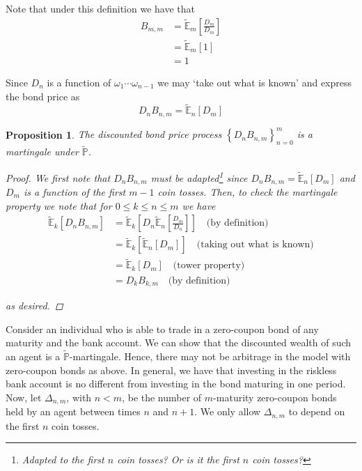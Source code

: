 \documentclass[12pt]{article}
\newtheorem{proposition}{Proposition}
\newlength\tindent
\renewcommand{\indent}{\hspace*{\tindent}}
\renewcommand{\P}{\mathbb P}
\newcommand{\E}{\mathbb E}
\begin{document}
Note that under this definition we have that
\begin{align*}
	B_{m,m} &= \tilde{\E}_m \left[ \frac{D_m}{D_m} \right] \\
	&= \tilde{\E}_m \left[ 1 \right] \\
	&= 1
\end{align*}

\indent Since $D_n$ is a function of $\omega_1\cdots\omega_{n - 1}$ we may `take out what is known' and express the bond price as
\begin{equation*}
	D_nB_{n,m} = \tilde{\E}_n[D_m]
\end{equation*}

\begin{proposition} The discounted bond price process $\left\{ D_nB_{n,m} \right\}^m_{n = 0}$ is a martingale under $\tilde{\P}$. 

\begin{proof} We first note that $D_nB_{n,m}$ must be adapted\footnote{Adapted to the first $n$ coin tosses? Or is it the first $n$ coin tosses?} since $D_nB_{n,m} = \tilde{\E}_n[D_m]$ and $D_m$ is a function of the first $m - 1$ coin tosses. Then, to check the martingale property we note that for $0 \leq k \leq n \leq m$ we have
\begin{align*}
	\tilde{\E}_k[D_nB_{n,m}] &= \tilde{\E}_k \left[ D_n \tilde{\E}_n \left[ \frac{D_m}{D_n} \right] \right] \quad \text{(by definition)} \\
	&= \tilde{\E}_k \left[ \tilde{\E}_n [D_m] \right] \quad \text{(taking out what is known)} \\
	&= \tilde{\E}_k [D_m] \quad \text{(tower property)} \\
	&= D_kB_{k,m} \quad \text{(by definition)}
\end{align*}

as desired.
\end{proof}
\end{proposition}

\indent Consider an individual who is able to trade in a zero-coupon bond of any maturity and the bank account. We can show that the discounted wealth of such an agent is a $\tilde{\P}$-martingale. Hence, there may not be arbitrage in the model with zero-coupon bonds as above. In general, we have that investing in the riskless bank account is no different from investing in the bond maturing in one period. \\

\indent Now, let $\Delta_{n,m}$, with $n < m$, be the number of $m$-maturity zero-coupon bonds held by an agent between times $n$ and $n + 1$. We only allow $\Delta_{n,m}$ to depend on the first $n$ coin tosses. \\
\end{document}
